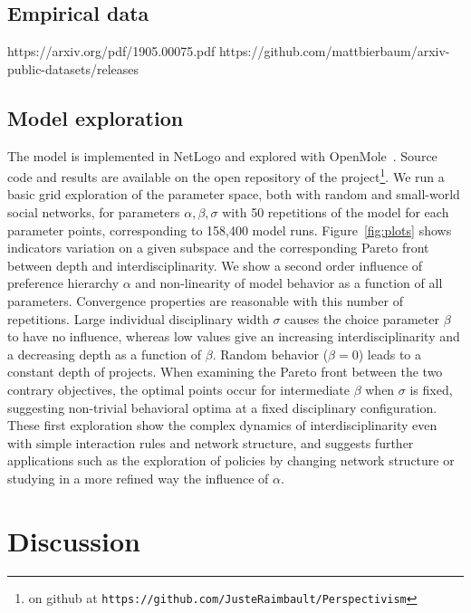 \documentclass[utf8]{frontiersFPHY} %
\begin{document}
\subsection{Empirical data}

https://arxiv.org/pdf/1905.00075.pdf %
https://github.com/mattbierbaum/arxiv-public-datasets/releases

\subsection{Model exploration}

The model is implemented in NetLogo and explored with OpenMole~\cite{reuillon2013openmole}. Source code and results are available on the open repository of the project\footnote{on github at \texttt{https://github.com/JusteRaimbault/Perspectivism}}. We run a basic grid exploration of the parameter space, both with random and small-world social networks, for parameters $\alpha,\beta,\sigma$ with 50 repetitions of the model for each parameter points, corresponding to 158,400 model runs. Figure~\ref{fig:plots} shows indicators variation on a given subspace and the corresponding Pareto front between depth and interdisciplinarity. We show a second order influence of preference hierarchy $\alpha$ and non-linearity of model behavior as a function of all parameters. Convergence properties are reasonable with this number of repetitions. Large individual disciplinary width $\sigma$ causes the choice parameter $\beta$ to have no influence, whereas low values give an increasing interdisciplinarity and a decreasing depth as a function of $\beta$. Random behavior ($\beta = 0$) leads to a constant depth of projects. When examining the Pareto front between the two contrary objectives, the optimal points occur for intermediate $\beta$ when $\sigma$ is fixed, suggesting non-trivial behavioral optima at a fixed disciplinary configuration. These first exploration show the complex dynamics of interdisciplinarity even with simple interaction rules and network structure, and suggests further applications such as the exploration of policies by changing network structure or studying in a more refined way the influence of $\alpha$.



\section{Discussion}
\end{document}
